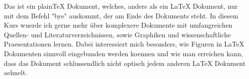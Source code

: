 Das ist ein plainTeX Dokument, welches, anders als ein LaTeX Dokument, nur mit dem Befehl "bye" auskommt, der am Ende des Dokuments steht. In diesem Kurs wuerde ich gerne mehr über komplexere Dokumente mit umfangreichen Quellen- und Literaturverzeichnissen, sowie Graphiken und wissenschaftliche Praesentationen lernen. Dabei interessiert mich besonders, wie Figuren in LaTeX Dokumenten sinnvoll eingebunden werden koennen und wie man erreichen kann, dass das Dokument schlussendlich nicht optisch jedem anderen LaTeX Dokument aehnelt.\bye
